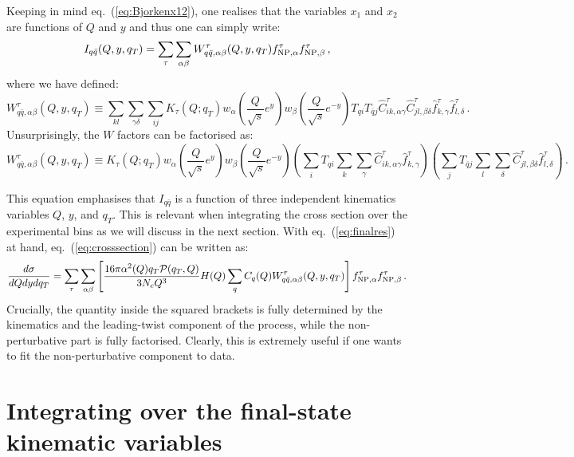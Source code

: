 \documentclass[10pt,a4paper]{article}
\begin{document}
Keeping in mind eq.~(\ref{eq:Bjorkenx12}), one realises that the
variables $x_1$ and $x_2$ are functions of $Q$ and $y$ and thus one
can simply write:
\begin{equation}\label{eq:finalres}
  I_{q\bar{q}}(Q, y, q_T) =
  \sum_\tau \sum_{\alpha\beta} W_{q\bar{q},\alpha\beta}^{\tau}(Q,y,q_T) f_{{\rm NP},\alpha}^\tau f_{{\rm NP},\beta}^\tau\,,
\end{equation}
where we have defined:
\begin{equation}
W_{q\bar{q},\alpha\beta}^{\tau}(Q,y,q_T)\equiv \sum_{kl} \sum_{\gamma\delta}\sum_{ij}K_\tau(Q;q_T) w_\alpha\left(\frac{Q}{\sqrt{s}}e^y\right)w_\beta\left(\frac{Q}{\sqrt{s}}e^{-y}\right) T_{qi}T_{\bar{q}j}\hat{C}_{ik,\alpha\gamma}^\tau
  \hat{C}_{jl,\beta\delta}^\tau \hat{f}_{k,\gamma}^\tau \hat{f}_{l,\delta}^\tau\,.
\end{equation}
Unsurprisingly, the $W$ factors can be factorised as:
\begin{equation}
  W_{q\bar{q},\alpha\beta}^{\tau}(Q,y,q_T)\equiv
  K_\tau(Q;q_T) w_\alpha\left(\frac{Q}{\sqrt{s}}e^y\right)w_\beta\left(\frac{Q}{\sqrt{s}}e^{-y}\right) \left(\sum_{i} T_{qi}\sum_{k} \sum_{\gamma}\hat{C}_{ik,\alpha\gamma}^\tau
    \hat{f}_{k,\gamma}^\tau\right)
  \left(\sum_{j} T_{\bar{q}j}\sum_{l} \sum_{\delta}
    \hat{C}_{jl,\beta\delta}^\tau \hat{f}_{l,\delta}^\tau\right)\,.
\end{equation}

This equation emphasises that $I_{q\bar{q}}$ is a function of three
independent kinematics variables $Q$, $y$, and $q_T$. This is relevant
when integrating the cross section over the experimental bins as we
will discuss in the next section. With eq.~(\ref{eq:finalres}) at
hand, eq.~(\ref{eq:crosssection}) can be written as:
\begin{equation}
\frac{d\sigma}{dQ dy dq_T} =\sum_\tau \sum_{\alpha\beta}\left[
  \frac{16\pi\alpha^2(Q)q_T\mathcal{P}(q_T,Q)}{3N_c Q^3} H(Q) 
  \sum_q C_q(Q) W_{q\bar{q},\alpha\beta}^{\tau}(Q,y,q_T) \right]f_{{\rm NP},\alpha}^\tau f_{{\rm NP},\beta}^\tau\,.
\end{equation}
Crucially, the quantity inside the squared brackets is fully
determined by the kinematics and the leading-twist component of the
process, while the non-perturbative part is fully factorised. Clearly,
this is extremely useful if one wants to fit the non-perturbative
component to data.

\section{Integrating over the final-state kinematic variables}
\end{document}
